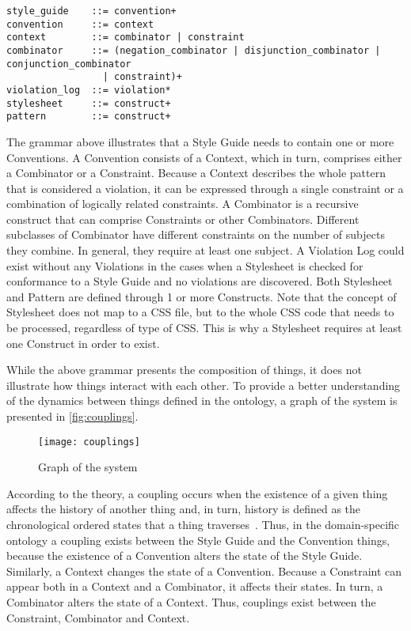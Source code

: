 \begin{snippet}
\begin{verbatim}
style_guide    ::= convention+
convention     ::= context
context        ::= combinator | constraint
combinator     ::= (negation_combinator | disjunction_combinator | conjunction_combinator 
                 | constraint)+
violation_log  ::= violation*
stylesheet     ::= construct+
pattern        ::= construct+
\end{verbatim}
\end{snippet}

The grammar above illustrates that a Style Guide needs to contain one or more Conventions. A
Convention consists of a Context, which in turn, comprises either a Combinator or a Constraint.
Because a Context describes the whole pattern that is considered a violation, it can be expressed
through a single constraint or a combination of logically related constraints. A Combinator is a
recursive construct that can comprise Constraints or other Combinators. Different subclasses of
Combinator have different constraints on the number of subjects they combine. In general, they
require at least one subject. A Violation Log could exist without any Violations in the
cases when a Stylesheet is checked for conformance to a Style Guide and no violations are
discovered. Both Stylesheet and Pattern are defined through 1 or more Constructs. Note that the
concept of Stylesheet does not map to a CSS file, but to the whole CSS code that needs to be
processed, regardless of type of CSS. This is why a Stylesheet requires at least one Construct in
order to exist.

While the above grammar presents the composition of things, it does not illustrate how things
interact with each other. To provide a better understanding of the dynamics between things defined
in the ontology, a graph of the system is presented in \autoref{fig:couplings}.

\begin{figure}[h]
  \centering
  \caption{Graph of the system}
  \label{fig:couplings}
  \texttt{[image: couplings]}
\end{figure}

According to the theory, a coupling occurs when the existence of a given thing affects the history
of another thing and, in turn, history is defined as the chronological ordered states that a thing
traverses~\cite{wand1990ontological}. Thus, in the domain-specific ontology a coupling exists
between the Style Guide and the Convention things, because the existence of a Convention alters the
state of the Style Guide. Similarly, a Context changes the state of a Convention. Because a
Constraint can appear both in a Context and a Combinator, it affects their states. In turn, a
Combinator alters the state of a Context. Thus, couplings exist between the Constraint, Combinator
and Context.

